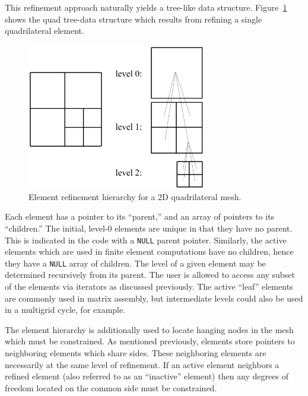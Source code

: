 This refinement approach naturally yields a tree-like data structure.
Figure~\ref{fig:hierarchy} shows the quad tree-data structure which
results from refining a single quadrilateral element.
\begin{figure}[hbtp]
  \begin{center}
    \includegraphics[width=0.7\textwidth]{figures/data_structures/hierarchy}
    \caption{Element refinement hierarchy for a 2D quadrilateral mesh.\label{fig:hierarchy}}
  \end{center}
\end{figure}
Each element has a pointer to its ``parent,'' and an array of pointers
to its ``children.''  The initial, level-0 elements are unique in that
they have no parent.  This is indicated in the code with a
\texttt{NULL} parent pointer.  Similarly, the active elements which
are used in finite element computations have no children, hence they
have a \texttt{NULL} array of children.  The level of a given element
may be determined recursively from its parent.  The user is allowed to
access any subset of the elements via iterators as discussed
previously.  The active ``leaf'' elements are commonly used in matrix
assembly, but intermediate levels could also be used in a multigrid
cycle, for example.

The element hierarchy is additionally used to locate hanging nodes in
the mesh which must be constrained.  As mentioned previously, elements
store pointers to neighboring elements which share sides.  These
neighboring elements are necessarily at the same level of refinement.
If an active element neighbors a refined element (also referred to as
an ``inactive'' element) then any degrees of freedom located on the
common side must be constrained.

